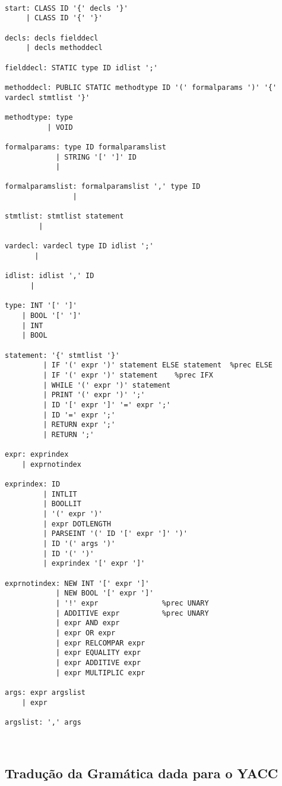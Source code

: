 \documentclass[11pt,a4paper]{article}
\begin{document}
\begin{lstlisting}

start: CLASS ID '{' decls '}'
	 | CLASS ID '{' '}'

decls: decls fielddecl
     | decls methoddecl

fielddecl: STATIC type ID idlist ';'

methoddecl: PUBLIC STATIC methodtype ID '(' formalparams ')' '{' vardecl stmtlist '}'

methodtype: type 
          | VOID
          
formalparams: type ID formalparamslist
            | STRING '[' ']' ID
            |

formalparamslist: formalparamslist ',' type ID   
                |

stmtlist: stmtlist statement
        |

vardecl: vardecl type ID idlist ';'
	   |

idlist: idlist ',' ID
      |

type: INT '[' ']'
    | BOOL '[' ']'
    | INT
    | BOOL

statement: '{' stmtlist '}'
         | IF '(' expr ')' statement ELSE statement  %prec ELSE
         | IF '(' expr ')' statement    %prec IFX   
         | WHILE '(' expr ')' statement
         | PRINT '(' expr ')' ';'
         | ID '[' expr ']' '=' expr ';' 
         | ID '=' expr ';'
         | RETURN expr ';'
         | RETURN ';'         

expr: exprindex
	| exprnotindex
	
exprindex: ID
     	 | INTLIT
     	 | BOOLLIT
     	 | '(' expr ')'
     	 | expr DOTLENGTH
     	 | PARSEINT '(' ID '[' expr ']' ')'
     	 | ID '(' args ')'
     	 | ID '(' ')'
         | exprindex '[' expr ']'

exprnotindex: NEW INT '[' expr ']'
     		| NEW BOOL '[' expr ']'
     	 	| '!' expr               %prec UNARY
     	 	| ADDITIVE expr          %prec UNARY
     	 	| expr AND expr
     	 	| expr OR expr
     	 	| expr RELCOMPAR expr
     	 	| expr EQUALITY expr
     	 	| expr ADDITIVE expr
     	 	| expr MULTIPLIC expr

args: expr argslist
    | expr
 
argslist: ',' args

   
\end{lstlisting}

\subsection{Tradução da Gramática dada para o YACC}
\end{document}
